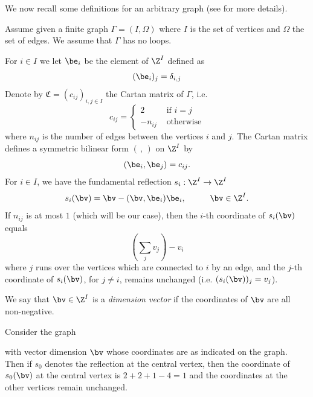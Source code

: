  


We now recall some definitions for an arbitrary graph (see \cite[Chapter 5]{kac} for more details).

Assume given a finite graph $\Gamma=(I,\Omega)$ where $I$ is the set of vertices and $\Omega$ the set of edges. We assume that $\Gamma$ has no loops.

For $i\in I$ we let $\be_i$ be the element of $\Z^I$ defined as 
$$
(\be_i)_j=\delta_{i,j}
$$
Denote by ${\mathfrak C}=(c_{ij})_{i,j\in I}$ the Cartan matrix of $\Gamma$, i.e.
$$
c_{ij}=\begin{cases}2 &\text{ if } i=j \\
	-n_{ij}&\text{ otherwise}\end{cases}
$$
where $n_{ij}$ is the number of edges between the vertices $i$ and $j$. The Cartan matrix defines a symmetric bilinear form $(\,,\,)$ on $\Z^I$ by
$$
(\be_i,\be_j)=c_{ij}.
$$
For $i\in I$, we have the fundamental reflection $s_i:\Z^I\rightarrow\Z^I$
$$
s_i(\bv)=\bv-(\bv,\be_i)\be_i,\hspace{1cm}\bv\in\Z^I.
$$
If $n_{ij}$ is at most $1$ (which will be our case), then the $i$-th coordinate of $s_i(\bv)$ equals 
$$
(\sum_j v_j)-v_i
$$
where $j$ runs over the vertices which are connected to $i$ by an edge, and the $j$-th coordinate of $s_i(\bv)$, for $j\neq i$, remains unchanged (i.e. $(s_i(\bv))_j=v_j$).


We say that $\bv\in\Z^I$ is a \emph{dimension vector} if the coordinates of $\bv$ are all non-negative.





\begin{exam}Consider the graph
	{\footnotesize{
			\begin{center}
	\end{center}}}
	\noindent with vector dimension $\bv$ whose coordinates are as indicated on the graph. Then if $s_0$ denotes the reflection at the central vertex, then the coordinate of $s_0(\bv)$ at the central vertex is $2+2+1-4=1$ and the coordinates at the other vertices remain unchanged.
	\label{exD4}\end{exam}



